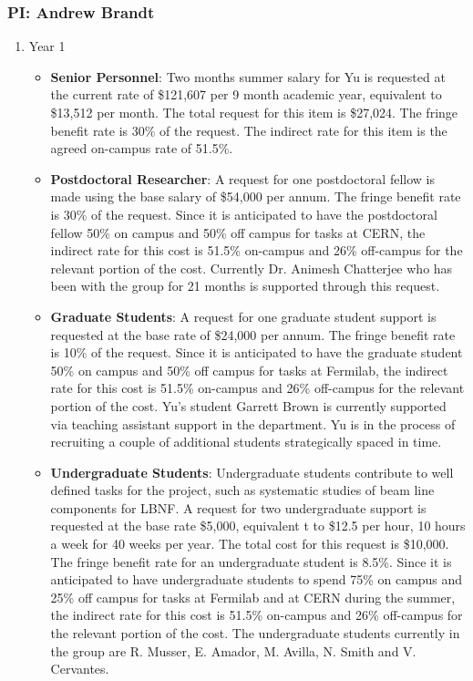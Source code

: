 \newpage
\subsubsection{\bf PI: Andrew Brandt}

\begin{enumerate}

\item{Year 1}
\begin{itemize}
\item{{\bf Senior Personnel}: Two months summer salary for Yu is requested at the current rate of \$121,607 per 9 month academic year, equivalent to \$13,512 per month.  The total request for this item is \$27,024.   The fringe benefit rate is 30\% of the request.  The indirect rate for this item is the agreed on-campus rate of 51.5\%.}

\item {{\bf Postdoctoral Researcher}: A request for one postdoctoral fellow is made using the base salary of \$54,000 per annum.  The fringe benefit rate is 30\% of the request.  Since it is anticipated to have the postdoctoral fellow 50\% on campus and 50\% off campus for tasks at CERN, the indirect rate for this cost is 51.5\% on-campus and 26\% off-campus for the relevant portion of the cost.  Currently Dr. Animesh Chatterjee who has been with the group for 21 months is supported through this request.} 

\item{{\bf Graduate Students}: A request for one graduate student support is requested at the base rate of \$24,000 per annum.   The fringe benefit rate is 10\% of the request.  Since it is anticipated to have the graduate student 50\% on campus and 50\% off campus for tasks at Fermilab, the indirect rate for this cost is 51.5\% on-campus and 26\% off-campus for the relevant portion of the cost.   Yu’s student Garrett Brown is currently supported via teaching assistant support in the department.   Yu is in the process of recruiting a couple of additional students strategically spaced in time. }

\item {{\bf Undergraduate Students}: Undergraduate students contribute to well defined tasks for the project, such as systematic studies of beam line components for LBNF.  A request for two undergraduate support is requested at the base rate \$5,000, equivalent t to \$12.5 per hour, 10 hours a week for 40 weeks per year.  The total cost for this request is \$10,000.  The fringe benefit rate for an undergraduate student is 8.5\%.  Since it is anticipated to have undergraduate students to spend 75\% on campus and 25\% off campus for tasks at Fermilab and at CERN during the summer, the indirect rate for this cost is 51.5\% on-campus and 26\% off-campus for the relevant portion of the cost.   The undergraduate students currently in the group are R. Musser,  E. Amador, M. Avilla, N. Smith and V. Cervantes.}


\end{itemize}
\end{enumerate}
